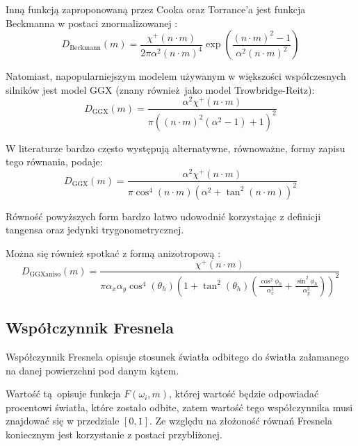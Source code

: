 \documentclass[../main.tex]{subfiles}
\begin{document}
Inną funkcją zaproponowaną przez Cooka oraz Torrance'a jest funkcja Beckmanna \cite{CookTorrance} w postaci znormalizowanej \cite{pbr_background}:
\begin{equation}
  D_{\text{Beckmann}}(m) =
    \frac{\chi^{+}(n \cdot m)}{2\pi\alpha^2 (n \cdot m)^{4}}
    \exp\left(
      \frac{
        (n \cdot m)^2 - 1
      }{
        \alpha^2 (n \cdot m)^2
      }
    \right)
\end{equation}

Natomiast, napopularniejszym modelem używanym w większości współczesnych silników jest model GGX (znany również jako model Trowbridge-Reitz):
\begin{equation}
  D_{\text{GGX}}(m) =
    \frac{
      \alpha^2 \chi^{+}(n \cdot m)
    }{
      \pi \left(
        \left(n \cdot m \right)^{2}
        \left(\alpha^2 - 1 \right)
        + 1
      \right)^2
    }
\label{eq:pbr_classic_ggx}
\end{equation}

W literaturze bardzo często występują alternatywne, równoważne, formy zapisu
tego równania, \cite{WalterMicrofacetModels} podaje:
\begin{equation}
  D_{\text{GGX}}(m) =
    \frac{\alpha^2 \chi^{+}(n \cdot m)}{
      \pi \cos^{4} (n \cdot m) \left( \alpha^2 + \tan^2 (n \cdot m) \right)^2
    }
\end{equation}

\noindent Równość powyższych form bardzo łatwo udowodnić korzystając z
definicji tangensa oraz jedynki trygonometrycznej.

Można się również spotkać z formą anizotropową \cite{pbrt}:
\begin{equation}
  D_{\text{GGXaniso}}(m) =
    \frac{\chi^{+}(n \cdot m)}{
      \pi \alpha_x \alpha_y \cos^{4} (\theta_h) \left(
        1 + \tan^{2}(\theta_h) \left(
          \frac{\cos^{2}{\phi_h}}{\alpha_{x}^{2}} +
          \frac{\sin^{2}{\phi_h}}{\alpha_{y}^{2}}
        \right)
      \right)^{2}
    }
\end{equation}

\subsection{Współczynnik Fresnela}

Współczynnik Fresnela opisuje stosunek światła odbitego do światła załamanego
na danej powierzchni pod danym kątem.

Wartość tą opisuje funkcja $F(\omega_i,m)$, której wartość będzie odpowiadać
procentowi światła, które zostało odbite, zatem wartość tego współczynnika musi
znajdować się w przedziale $[0,1]$. Ze względu na złożoność równań Fresnela
koniecznym jest korzystanie z postaci przybliżonej. 
\end{document}
